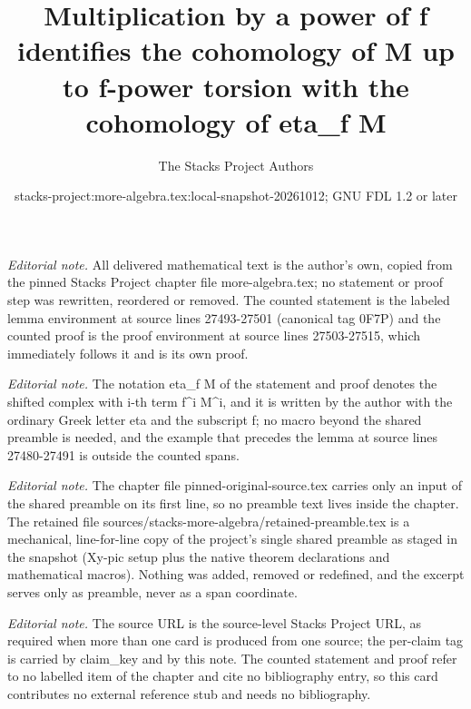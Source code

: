 \documentclass[10pt,a4paper]{amsart}
\title{Multiplication by a power of f identifies the cohomology of M up to f-power torsion with the cohomology of eta\_f M}
\author{The Stacks Project Authors}
\date{stacks-project:more-algebra.tex:local-snapshot-20261012; GNU FDL 1.2 or later}
\theoremstyle{plain}
\theoremstyle{definition}
\theoremstyle{remark}
\numberwithin{equation}{subsection}
\begin{document}
\maketitle
\setcounter{subsection}{1}
\noindent\textit{Editorial note.} All delivered mathematical text is the author's own, copied from the pinned Stacks Project chapter file more-algebra.tex; no statement or proof step was rewritten, reordered or removed. The counted statement is the labeled lemma environment at source lines 27493-27501 (canonical tag 0F7P) and the counted proof is the proof environment at source lines 27503-27515, which immediately follows it and is its own proof.\par\medskip
\noindent\textit{Editorial note.} The notation eta\_f M of the statement and proof denotes the shifted complex with i-th term f\textasciicircum{}i M\textasciicircum{}i, and it is written by the author with the ordinary Greek letter eta and the subscript f; no macro beyond the shared preamble is needed, and the example that precedes the lemma at source lines 27480-27491 is outside the counted spans.\par\medskip
\noindent\textit{Editorial note.} The chapter file pinned-original-source.tex carries only an input of the shared preamble on its first line, so no preamble text lives inside the chapter. The retained file sources/stacks-more-algebra/retained-preamble.tex is a mechanical, line-for-line copy of the project's single shared preamble as staged in the snapshot (Xy-pic setup plus the native theorem declarations and mathematical macros). Nothing was added, removed or redefined, and the excerpt serves only as preamble, never as a span coordinate.\par\medskip
\noindent\textit{Editorial note.} The source URL is the source-level Stacks Project URL, as required when more than one card is produced from one source; the per-claim tag is carried by claim\_key and by this note. The counted statement and proof refer to no labelled item of the chapter and cite no bibliography entry, so this card contributes no external reference stub and needs no bibliography.\par\medskip
\end{document}
